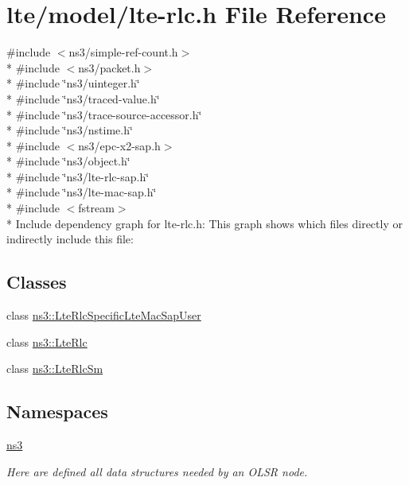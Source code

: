 \hypertarget{lte-rlc_8h}{}\section{lte/model/lte-\/rlc.h File Reference}
\label{lte-rlc_8h}
{\ttfamily \#include $<$ns3/simple-\/ref-\/count.\+h$>$}\\*
{\ttfamily \#include $<$ns3/packet.\+h$>$}\\*
{\ttfamily \#include \char`\"{}ns3/uinteger.\+h\char`\"{}}\\*
{\ttfamily \#include \char`\"{}ns3/traced-\/value.\+h\char`\"{}}\\*
{\ttfamily \#include \char`\"{}ns3/trace-\/source-\/accessor.\+h\char`\"{}}\\*
{\ttfamily \#include \char`\"{}ns3/nstime.\+h\char`\"{}}\\*
{\ttfamily \#include $<$ns3/epc-\/x2-\/sap.\+h$>$}\\*
{\ttfamily \#include \char`\"{}ns3/object.\+h\char`\"{}}\\*
{\ttfamily \#include \char`\"{}ns3/lte-\/rlc-\/sap.\+h\char`\"{}}\\*
{\ttfamily \#include \char`\"{}ns3/lte-\/mac-\/sap.\+h\char`\"{}}\\*
{\ttfamily \#include $<$fstream$>$}\\*
Include dependency graph for lte-\/rlc.h\+:
This graph shows which files directly or indirectly include this file\+:
\subsection*{Classes}
\begin{DoxyCompactItemize}
\item 
class \hyperlink{classns3_1_1LteRlcSpecificLteMacSapUser}{ns3\+::\+Lte\+Rlc\+Specific\+Lte\+Mac\+Sap\+User}
\item 
class \hyperlink{classns3_1_1LteRlc}{ns3\+::\+Lte\+Rlc}
\item 
class \hyperlink{classns3_1_1LteRlcSm}{ns3\+::\+Lte\+Rlc\+Sm}
\end{DoxyCompactItemize}
\subsection*{Namespaces}
\begin{DoxyCompactItemize}
\item 
 \hyperlink{namespacens3}{ns3}
\begin{DoxyCompactList}\small\item\em Here are defined all data structures needed by an O\+L\+SR node. \end{DoxyCompactList}\end{DoxyCompactItemize}

